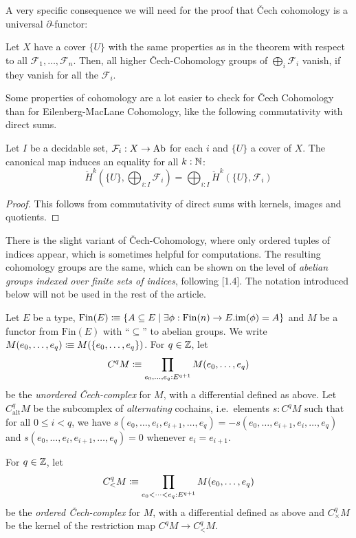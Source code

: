 A very specific consequence we will need for the proof that \v{C}ech cohomology is a universal $\partial$-functor:

\begin{corollary}%
  \label{chech-coefficient-sum}
  Let $X$ have a cover $\{U\}$ with the same properties as in the theorem with respect to all $\mathcal F_1,\dots,\mathcal F_n$.
  Then, all higher \v{C}ech-Cohomology groups of $\bigoplus_{i}\mathcal F_i$ vanish,
  if they vanish for all the $\mathcal F_i$.
\end{corollary}

Some properties of cohomology are a lot easier to check for \v{C}ech Cohomology than for Eilenberg-MacLane Cohomology,
like the following commutativity with direct sums.

\begin{lemma}
  \label{cech-commute-direct-sum}
  Let $I$ be a decidable set, $\mathcal F_i:X\to \operatorname{Ab}$ for each $i$ and $\{U\}$ a cover of $X$.
  The canonical map induces an equality for all $k:\mathbb{N}$:
  \[
    \check{H}^k(\{U\},\bigoplus_{i:I} \mathcal F_i)=\bigoplus_{i:I}\check{H}^k(\{U\},\mathcal F_i)
  \]
\end{lemma}

\begin{proof}
  This follows from commutativity of direct sums with kernels, images and quotients.
\end{proof}

There is the slight variant of \v{C}ech-Cohomology, where only ordered tuples of indices appear, which is sometimes helpful for computations.
The resulting cohomology groups are the same, which can be shown on the level of \emph{abelian groups indexed over finite sets of indices},
following \cite{soergel-sheaf-cohomology}[1.4].
The notation introduced below will not be used in the rest of the article.

\begin{definition}
  Let $E$ be a type, $\mathrm{Fin}(E)\vcentcolon\mspace{-1.2mu}\equiv \{A\subseteq E \mid \exists \phi:\mathrm{Fin}(n)\to E.\mathrm{im}(\phi)=A \}$
  and $M$ be a functor from $\mathrm{Fin}(E)$ with ``$\subseteq$'' to abelian groups. We write $M(e_0,\dots,e_q)\vcentcolon\mspace{-1.2mu}\equiv M(\{e_0,\dots,e_q\})$.
  For $q\in \mathbb{Z}$, let
  \[
    C^qM\vcentcolon\mspace{-1.2mu}\equiv \prod_{e_0,\dots,e_q:E^{q+1}}M(e_0,\dots,e_q)
  \]
  be the \emph{unordered \v{C}ech-complex} for $M$, with a differential defined as above.
  Let $C^q_{\mathrm{alt}}M$ be the subcomplex of \emph{alternating} cochains, i.e.\ elements $s:C^qM$ such that
  for all $0\leq i<q$, we have $s(e_0,\dots,e_i,e_{i+1},\dots,e_q)=-s(e_0,\dots,e_{i+1},e_i,\dots,e_q)$ and $s(e_0,\dots,e_i,e_{i+1},\dots,e_q)=0$
  whenever $e_i=e_{i+1}$.

  For $q\in \mathbb{Z}$, let
  \[
    C^q_<M\vcentcolon\mspace{-1.2mu}\equiv \prod_{e_0<\dots <e_q:E^{q+1}}M(e_0,\dots,e_q)
  \]
  be the \emph{ordered \v{C}ech-complex} for $M$, with a differential defined as above and
  $C^q_{\times}M$ be the kernel of the restriction map $C^qM\to C^q_<M$.
\end{definition}

